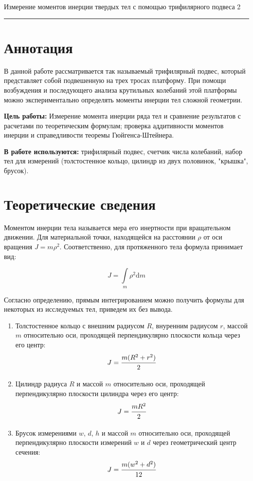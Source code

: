\documentclass[12pt,a4paper]{scrartcl}
\begin{document}
	
	\begin{flushleft}
		\footnotesize{Измерение моментов инерции твердых тел с помощью трифилярного подвеса} \hspace{\fill} \footnotesize{2}
		\\[-0.3cm]\noindent\rule{\textwidth}{0.3pt}
	\end{flushleft}

	\section{Аннотация}
	
	В данной работе рассматривается так называемый трифилярный подвес, который представляет собой подвешенную на трех тросах платформу. При помощи возбуждения и последующего анализа крутильных колебаний этой платформы можно экспериментально определять моменты инерции тел сложной геометрии.
	
	\textbf{Цель работы:}
	Измерение момента инерции ряда тел и сравнение результатов с расчетами по теоретическим формулам; проверка аддитивности моментов инерции и справедливости теоремы Гюйгенса-Штейнера.

	\textbf{В работе используются:} трифилярный подвес, счетчик числа колебаний, набор тел для измерений (толстостенное кольцо, цилиндр из двух половинок, "крышка", брусок).

	\section{Теоретические сведения}
	\begin{dfn}
		Моментом инерции тела называется мера его инертности при вращательном движении. Для материальной точки, находящейся на расстоянии $\rho$ от оси вращения $J = m\rho^2$. Соответственно, для протяженного тела формула принимает вид:
		
		$$J = \underset{m}{\int}\rho^2 \mathrm{d}m$$
	\end{dfn}

	Согласно определению, прямым интегрированием можно получить формулы для некоторых из исследуемых тел, приведем их без вывода.
	
	\begin{st} \hfill
		\begin{enumerate}
			\item Толстостенное кольцо с внешним радиусом $R$, внуренним радиусом $r$, массой $m$ относительно оси, проходящей перпендикулярно плоскости кольца через его центр:
			$$J = \dfrac{\strut m(R^2 + r^2)}{\strut 2}$$
			
			\item Цилиндр радиуса $R$ и массой $m$ относительно оси, проходящей перпендикулярно плоскости цилиндра через его центр:
			$$J = \dfrac{\strut mR^2}{\strut 2}$$
			
			\item Брусок измерениями $w$, $d$, $h$ и массой $m$ относительно оси, проходящей перпендикулярно плоскости измерений $w$ и $d$ через геометрический центр сечения:
			$$J = \dfrac{\strut m(w^2 + d^2)}{\strut 12}$$
		\end{enumerate}
	\end{st}
\end{document}
